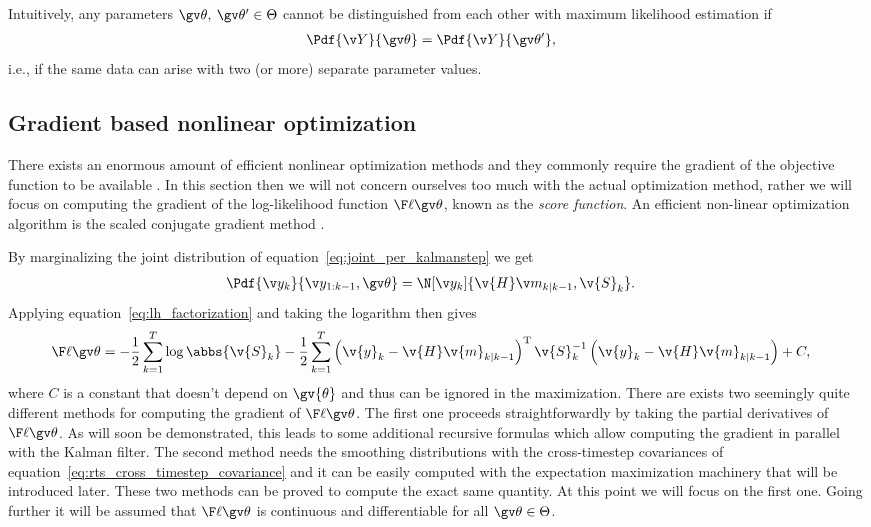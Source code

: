 Intuitively, any parameters $\Th,\:\Th' \in \Theta$ cannot be distinguished
from each other with maximum likelihood estimation if
\begin{align}
	\Pdf{\Y}{\Th}&=\Pdf{\Y}{\Th'},
\end{align}
i.e., if the same data can arise with two (or more) separate
parameter values.
\parencite{Haykin2001,Cappe2005}

\subsection{Gradient based nonlinear optimization}\label{sec:grad}%

There exists an enormous amount of efficient nonlinear optimization methods and
they commonly require the gradient of the objective function to be available .
In this section then we will not concern ourselves too much with the actual
optimization method, rather we will focus on computing the gradient of the
log-likelihood function $\lLH$, known as the \emph{score function}.
An efficient non-linear optimization algorithm is the scaled 
conjugate gradient method \parencite{Mbalawataa}.

By marginalizing the joint distribution of equation~\eqref{eq:joint_per_kalmanstep}
we get 
\begin{align}
	\Pdf{\y_k}{\y_{1:k-1},\Th}&=\N[\yk]{\v{H}\m_{k|k-1},\v{S}_k }.
\end{align}
Applying equation~\eqref{eq:lh_factorization} and taking the logarithm then gives
\begin{align}
	\lLH&=-\frac{1}{2}\sum_{k=1}^T\log\abbs{\v{S}_k}
	-\frac{1}{2}\sum_{k=1}^T\left(\v{y}_k-\v{H}\v{m}_{k|k-1}\right)^\tr\v{S}_{k}^{-1}\left(\v{y}_k-\v{H}\v{m}_{k|k-1}\right)+C,
	\label{eq:logLH}
\end{align}
where $C$ is a constant that doesn't depend on $\gv{\theta}$ and thus can
be ignored in the maximization.
There are exists two seemingly quite different methods for computing
the gradient of $\lLH$. The first one proceeds straightforwardly by taking the
partial derivatives of $\lLH$. As will soon be demonstrated, this leads
to some additional recursive formulas which allow computing
the gradient in parallel with the Kalman filter. The second method needs
the smoothing distributions with the cross-timestep covariances of equation~\eqref{eq:rts_cross_timestep_covariance}
and it can be easily computed with the expectation maximization machinery
that will be introduced later. These two methods can be proved to compute
the exact same quantity. At this point we will focus on the first one. Going further
it will be assumed that $\lLH$ is continuous and differentiable for all $\Th\in\Theta$.

